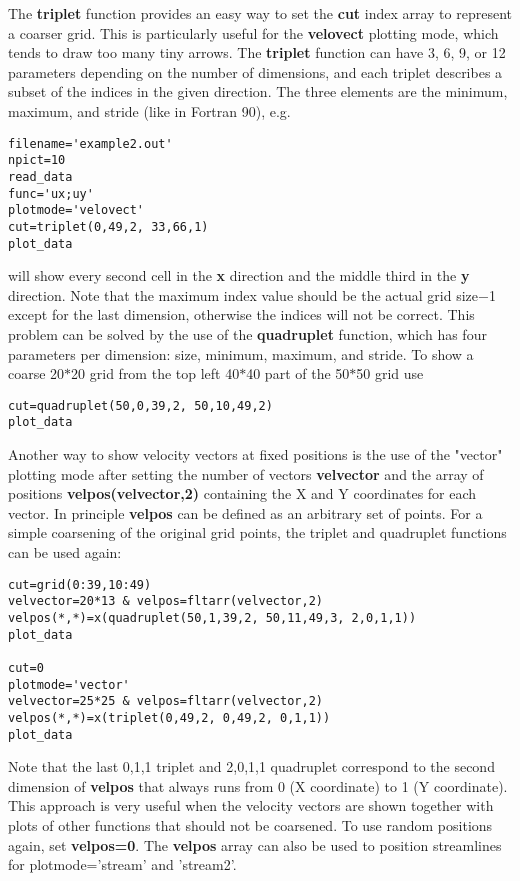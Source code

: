 \documentclass{article}
\begin{document}
The {\bf triplet} function provides an easy way to set the {\bf cut} 
index array to represent a coarser grid. This is particularly useful
for the {\bf velovect} plotting mode, which tends to draw too many tiny arrows.
The {\bf triplet} function can have 3, 6, 9, or 12 parameters depending on 
the number of dimensions, and each triplet describes a subset of the 
indices in the given direction. The three elements are the 
minimum, maximum, and stride (like in Fortran 90), e.g. 
\begin{verbatim}
filename='example2.out'
npict=10
read_data
func='ux;uy'
plotmode='velovect'
cut=triplet(0,49,2, 33,66,1)
plot_data
\end{verbatim}
will show every second cell in the {\bf x} direction and the middle third 
in the {\bf y} direction. Note that the maximum index value should be
the actual grid size$-$1 except for the last dimension, otherwise the 
indices will not be correct. This problem can be solved by the use of the 
{\bf quadruplet} function, which has four parameters per dimension:
size, minimum, maximum, and stride. To show a coarse 20$*$20 grid 
from the top left 40$*$40 part of the 50$*$50 grid use
\begin{verbatim}
cut=quadruplet(50,0,39,2, 50,10,49,2)
plot_data
\end{verbatim}
Another way to show velocity vectors at fixed positions is the use of 
the "vector" plotting mode after setting the number of vectors {\bf velvector} 
and the array of positions {\bf velpos(velvector,2)} containing the 
X and Y coordinates for each vector. In principle {\bf velpos} can
be defined as an arbitrary set of points.
For a simple coarsening of the original grid points, the triplet and 
quadruplet functions can be used again:
\begin{verbatim}
cut=grid(0:39,10:49)
velvector=20*13 & velpos=fltarr(velvector,2)
velpos(*,*)=x(quadruplet(50,1,39,2, 50,11,49,3, 2,0,1,1))
plot_data

cut=0
plotmode='vector'
velvector=25*25 & velpos=fltarr(velvector,2)
velpos(*,*)=x(triplet(0,49,2, 0,49,2, 0,1,1))
plot_data
\end{verbatim}
Note that the last 0,1,1 triplet and 2,0,1,1 quadruplet correspond to
the second dimension of {\bf velpos} that always runs from 
0 (X coordinate) to 1 (Y coordinate). This approach is very useful when 
the velocity vectors are shown together with plots of other functions 
that should not be coarsened. To use random positions again, 
set {\bf velpos=0}.
The {\bf velpos} array can also be used to position streamlines for 
plotmode='stream' and 'stream2'.
\end{document}
